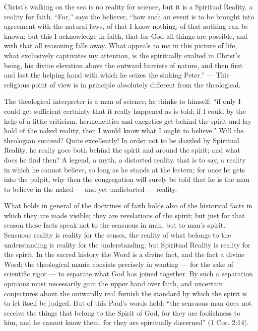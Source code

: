 \documentclass[12pt,a4paper,openany]{book}
\newcommand{\opage}[1]{\marginnote{\footnotesize\textit{[#1]}}}
\begin{document}
Christ's walking on the sea is no reality for
science, but it is a Spiritual Reality, a reality
for faith. ``For,'' says the believer, ``how
such an event is to be brought into agreement
with the natural laws, of that I know nothing, of that
nothing can be known; but this I acknowledge in faith, that
for God all things are possible, and with that all
reasoning falls away. What appeals to me in this picture of life,
what exclusively captivates my attention, is
the spiritually exalted in Christ's being, his divine
elevation above the outward barriers of nature, and then
first and last the helping hand with which he seizes
the sinking Peter.'' --- This religious point of view is
in principle absolutely different from the theological.

The theological interpreter is a man of science; he
thinks to himself: ``if only I could get sufficient certainty
that it really happened as is told; if I could
by the help of a little criticism, hermeneutics and exegetics
\setcounter{footnote}{0}%
\opage{311}get behind the spirit and lay hold of the naked reality,
then I would know what I ought to believe.'' Will
the theologian succeed? Quite excellently! In order not to be
dazzled by Spiritual Reality, he really goes both
behind the spirit and around the spirit; and what does he find
then? A legend, a myth, a distorted reality,
that is to say, a reality in which he cannot believe, so
long as he stands at the lectern; for once he
gets into the pulpit, why then the congregation
will surely be told that he is the man to believe in the naked
--- and yet undistorted --- reality.

What holds in general of the doctrines of faith
holds also of the historical facts in which
they are made visible; they are revelations of the spirit;
but just for that reason these facts speak
not to the sensuous in man, but to
man's spirit. Sensuous reality is reality
for the senses, the reality of what belongs to the understanding is
reality for the understanding; but Spiritual Reality is
reality for the spirit. In the sacred history the Word
is a divine fact, and the fact a
divine Word; the theological mania consists precisely
in wanting --- for the sake of scientific rigor --- to separate
what God has joined together. By such a separation
opinions must necessarily gain the upper hand over
faith, and uncertain conjectures about the outwardly real
furnish the standard by which the spirit is to let
itself be judged. But of this Paul's words hold: ``the sensuous
man does not receive the things that belong to the Spirit of God,
for they are foolishness to him, and he cannot know
them, for they are spiritually discerned'' (1 Cor. 2:14).
\end{document}
